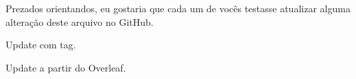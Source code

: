 \documentclass{article}
\begin{document}
Prezados orientandos,
eu gostaria que cada um de vocês testasse atualizar alguma alteração deste arquivo no GitHub.

Update com tag.

Update a partir do Overleaf.
\end{document}
